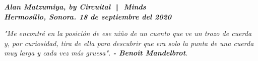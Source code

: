 \begin{center}
\vspace{5pt}
\begin{flushright}
	\textbf{\textit{
		Alan Matzumiya, by \textit{Circuital $\|$ Minds}\\
		Hermosillo, Sonora. 18 de septiembre del 2020\\
		}
	}
\end{flushright}

\vspace{5pt}
\begin{flushleft}
\parbox{0.45\linewidth}{
\textit{	
	"Me encontré en la posición de ese niño de un cuento que ve un trozo de cuerda y, por curiosidad, tira de ella para descubrir que era solo la punta de una cuerda muy larga y cada vez más gruesa". \textbf{ - Benoît Mandelbrot}.
	}
}
\end{flushleft}
\end{center}